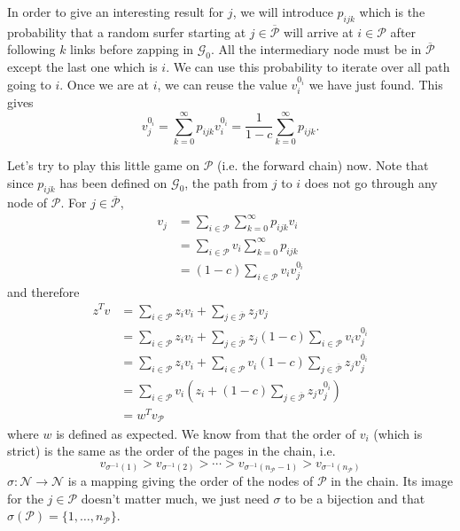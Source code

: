 \documentclass{article}
\newcommand{\1}{\mathbf{1}}
\theoremstyle{definition}
\begin{document}
In order to give an interesting result for \(j\), we will introduce \(p_{ijk}\) which is the probability that a random surfer starting at \(j \in \overline{\mathcal{P}}\)
will arrive at \(i \in \mathcal{P}\) after following \(k\) links before zapping in \(\mathcal{G}_0\).
All the intermediary node must be in \(\overline{\mathcal{P}}\) except the last one which is \(i\).
We can use this probability to iterate over all path going to \(i\).
Once we are at \(i\), we can reuse the value \(v_i^{0_i}\) we have just found.
This gives
\[ v_j^{0_i} = \sum_{k=0}^\infty p_{ijk} v_i^{0_i} = \frac{1}{1-c} \sum_{k=0}^\infty p_{ijk}. \]

Let's try to play this little game on \(\mathcal{P}\) (i.e. the forward chain) now.
Note that since \(p_{ijk}\) has been defined on \(\mathcal{G}_0\), the path from \(j\) to \(i\) does not go through any node of \(\mathcal{P}\).
For \(j \in \overline{\mathcal{P}}\),
\begin{align*}
  v_j & = \sum_{i \in \mathcal{P}} \sum_{k = 0}^\infty p_{ijk} v_i\\
      & = \sum_{i \in \mathcal{P}} v_i \sum_{k = 0}^\infty p_{ijk}\\
      & = (1-c) \sum_{i \in \mathcal{P}} v_i v_j^{0_i}
\end{align*}
and therefore
\begin{align*}
  z^T v
  & = \sum_{i \in \mathcal{P}} z_i v_i + \sum_{j \in \overline{\mathcal{P}}} z_j v_j\\
  & = \sum_{i \in \mathcal{P}} z_i v_i + \sum_{j \in \overline{\mathcal{P}}} z_j (1-c) \sum_{i \in \mathcal{P}} v_i v_j^{0_i}\\
  & = \sum_{i \in \mathcal{P}} z_i v_i + \sum_{i \in \mathcal{P}} v_i (1-c) \sum_{j \in \overline{\mathcal{P}}} z_j v_j^{0_i}\\
  & = \sum_{i \in \mathcal{P}} v_i \left(z_i + (1-c) \sum_{j \in \overline{\mathcal{P}}} z_jv_j^{0_i}\right)\\
  & = w^T v_\mathcal{P}
\end{align*}
where \(w\) is defined as expected.
We know from \cite{de2008maximizing} that the order of \(v_i\) (which is strict) is the same as
the order of the pages in the chain, i.e.
\[ v_{\sigma^{-1}(1)} > v_{\sigma^{-1}(2)} > \cdots > v_{\sigma^{-1}(n_\mathcal{P}-1)} > v_{\sigma^{-1}(n_\mathcal{P})} \]
\(\sigma : \mathcal{N} \to \mathcal{N}\) is a mapping giving the order of the nodes of \(\mathcal{P}\) in the chain.
Its image for the \(j \in \mathcal{P}\) doesn't matter much,
we just need \(\sigma\) to be a bijection and that \(\sigma(\mathcal{P}) = \{1, \ldots, n_\mathcal{P}\}\).
\end{document}
